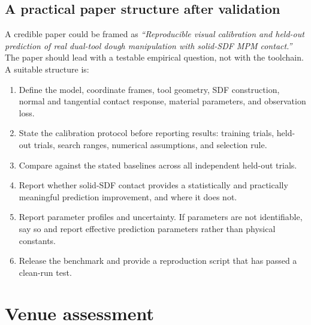 \documentclass[11pt]{article}
\begin{document}
\subsection{A practical paper structure after validation}

A credible paper could be framed as \emph{``Reproducible visual calibration and held-out prediction of real dual-tool dough manipulation with solid-SDF MPM contact.''} The paper should lead with a testable empirical question, not with the toolchain. A suitable structure is:

\begin{enumerate}[leftmargin=1.45em]
  \item Define the model, coordinate frames, tool geometry, SDF construction, normal and tangential contact response, material parameters, and observation loss.
  \item State the calibration protocol before reporting results: training trials, held-out trials, search ranges, numerical assumptions, and selection rule.
  \item Compare against the stated baselines across all independent held-out trials.
  \item Report whether solid-SDF contact provides a statistically and practically meaningful prediction improvement, and where it does not.
  \item Report parameter profiles and uncertainty. If parameters are not identifiable, say so and report effective prediction parameters rather than physical constants.
  \item Release the benchmark and provide a reproduction script that has passed a clean-run test.
\end{enumerate}

\section{Venue assessment}
\end{document}
